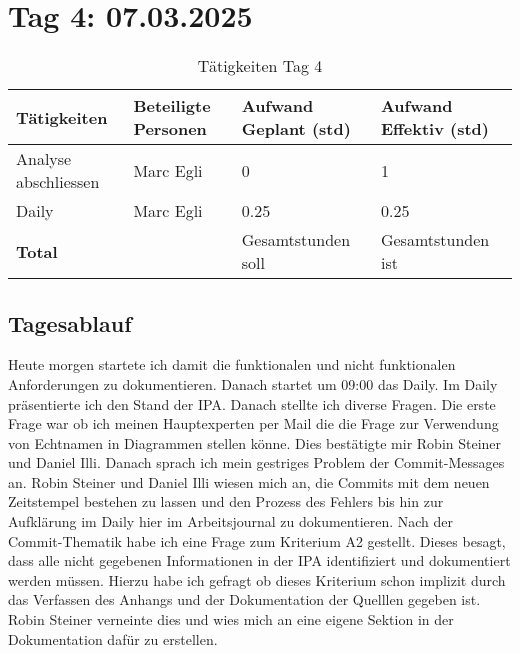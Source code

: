 \section{Tag 4: 07.03.2025}
\begin{table}[H]
    \begin{tabular}{|L{0.4\textwidth}|C{60pt}|C{60pt}|C{60pt}|}
        \hline
        \color{white}Tätigkeiten & \color{white}Beteiligte \color{white}Personen & \color{white}Aufwand Geplant (std) & \color{white}Aufwand Effektiv (std) \\
        \hline
         Analyse abschliessen & Marc Egli & 0 & 1 \\
        \hline
        Daily & Marc Egli & 0.25 & 0.25 \\
        \hline
        \textbf{Total} &  & Gesamtstunden soll & Gesamtstunden ist \\
        \hline
    \end{tabular}
    \caption{Tätigkeiten Tag 4}
\end{table}

\subsection*{Tagesablauf}
Heute morgen startete ich damit die funktionalen und nicht funktionalen Anforderungen zu dokumentieren. 
Danach startet um 09:00 das Daily. Im Daily präsentierte ich den Stand der IPA. Danach stellte ich diverse Fragen. Die
erste Frage war ob ich meinen Hauptexperten per Mail die die Frage zur Verwendung von Echtnamen in Diagrammen stellen könne. Dies
bestätigte mir Robin Steiner und Daniel Illi. Danach sprach ich mein gestriges Problem der Commit-Messages an. Robin Steiner und Daniel Illi
wiesen mich an, die Commits mit dem neuen Zeitstempel bestehen zu lassen und den Prozess des Fehlers bis hin zur Aufklärung im Daily
hier im Arbeitsjournal zu dokumentieren. Nach der Commit-Thematik habe ich eine Frage zum Kriterium A2 gestellt. Dieses besagt, dass alle
nicht gegebenen Informationen in der IPA identifiziert und dokumentiert werden müssen. Hierzu habe ich gefragt ob dieses Kriterium schon implizit durch das
Verfassen des Anhangs und der Dokumentation der Quelllen gegeben ist. Robin Steiner verneinte dies und wies mich an eine eigene Sektion in der Dokumentation
dafür zu erstellen.

